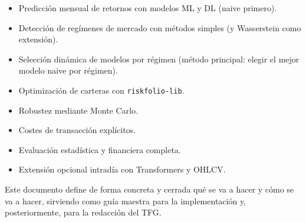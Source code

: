 \documentclass[12pt]{article}
\begin{document}
\begin{itemize}
    \item Predicción mensual de retornos con modelos ML y DL (naive primero).
    \item Detección de regímenes de mercado con métodos simples (y Wasserstein como extensión).
    \item Selección dinámica de modelos por régimen (método principal: elegir el mejor modelo naive por régimen).
    \item Optimización de carteras con \texttt{riskfolio-lib}.
    \item Robustez mediante Monte Carlo.
    \item Costes de transacción explícitos.
    \item Evaluación estadística y financiera completa.
    \item Extensión opcional intradía con Transformers y OHLCV.
\end{itemize}

Este documento define de forma concreta y cerrada qué se va a hacer y cómo se va a hacer, sirviendo como guía maestra para la implementación y, posteriormente, para la redacción del TFG.
\end{document}
